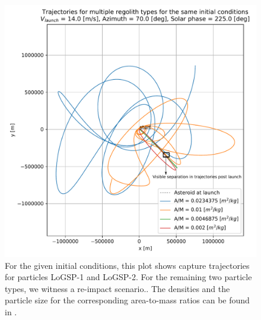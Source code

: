 \begin{figure}[htb]
\centering
\captionsetup{justification=centering}
\includegraphics[width=\textwidth, height=0.5\textheight, keepaspectratio=true]{leading_edge_perturbations/capture_reimpact_scenario_14ms_70Azim_225SolarPhase_edit.pdf}
\caption{For the given initial conditions, this plot shows capture trajectories for particles LoGSP-1 and LoGSP-2. For the remaining two particle types, we witness a re-impact scenario.. The densities and the particle size for the corresponding area-to-mass ratios can be found in .}
\label{fig:capture_reimpact_traj_14ms_70Azim_225solarPhase_leadingEdge}
\end{figure}
\FloatBarrier

